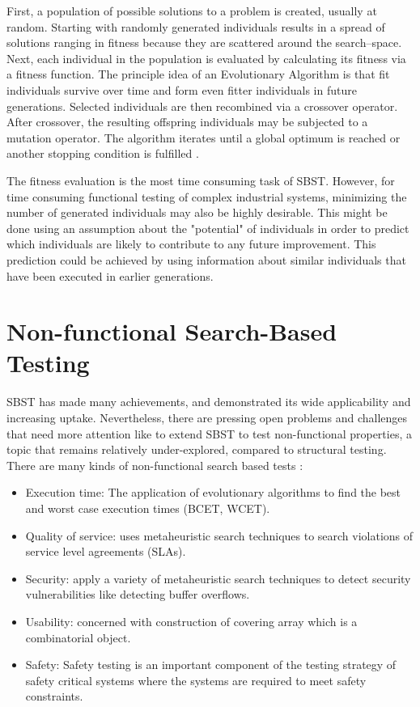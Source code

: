 First, a population of possible solutions to a problem
is created, usually at random. Starting with randomly
generated individuals results in a spread of solutions ranging in fitness because they are scattered around the search–space. Next, each individual in the population is evaluated by calculating its fitness via a fitness function. The principle idea of an Evolutionary Algorithm is that fit individuals survive over time and form even fitter individuals in future
generations. Selected individuals are then recombined
via a crossover operator. After crossover, the resulting offspring individuals may be subjected to a mutation operator. The algorithm iterates until a global optimum is reached or another stopping condition is fulfilled \cite{Baars2011}. 

The fitness evaluation is the most
time consuming task of SBST. However, for time consuming functional testing of complex industrial systems, minimizing
the number of generated individuals may also be highly desirable. This might be done using an assumption about
the "potential" of individuals in order to predict which individuals are likely to contribute to any future improvement.
This prediction could be achieved by using information about similar individuals that have been executed in earlier generations.



\section{Non-functional Search-Based Testing}

SBST has made many achievements, and demonstrated its wide applicability and increasing uptake. Nevertheless, there are pressing open problems and challenges that need more attention like to extend SBST to test non-functional properties, a topic that remains relatively under-explored, compared to structural testing. There are many kinds of non-functional search based tests  \cite{Afzal2009a}:

\begin{itemize}
\item Execution time: The application of evolutionary algorithms to find the best and worst case execution times (BCET, WCET).
\item Quality of service: uses metaheuristic search techniques to search violations of service level agreements (SLAs).
\item Security: apply a variety of metaheuristic search techniques  to detect security vulnerabilities like detecting buffer overflows.
\item Usability: concerned with construction of covering array which is a combinatorial object.
\item Safety: Safety testing is an important component of the testing strategy of safety critical systems where the systems are required to meet safety constraints.
\end{itemize}

